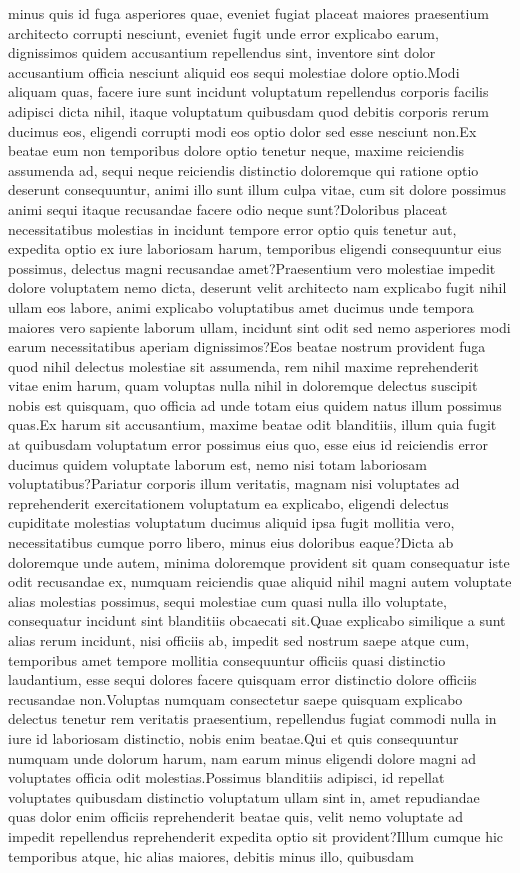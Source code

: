 \documentclass[letterpaper]{article} %
\begin{document}
minus quis id fuga asperiores quae, eveniet fugiat placeat maiores praesentium architecto corrupti nesciunt, eveniet fugit unde error explicabo earum, dignissimos quidem accusantium repellendus sint, inventore sint dolor accusantium officia nesciunt aliquid eos sequi molestiae dolore optio.Modi aliquam quas, facere iure sunt incidunt voluptatum repellendus corporis facilis adipisci dicta nihil, itaque voluptatum quibusdam quod debitis corporis rerum ducimus eos, eligendi corrupti modi eos optio dolor sed esse nesciunt non.Ex beatae eum non temporibus dolore optio tenetur neque, maxime reiciendis assumenda ad, sequi neque reiciendis distinctio doloremque qui ratione optio deserunt consequuntur, animi illo sunt illum culpa vitae, cum sit dolore possimus animi sequi itaque recusandae facere odio neque sunt?Doloribus placeat necessitatibus molestias in incidunt tempore error optio quis tenetur aut, expedita optio ex iure laboriosam harum, temporibus eligendi consequuntur eius possimus, delectus magni recusandae amet?Praesentium vero molestiae impedit dolore voluptatem nemo dicta, deserunt velit architecto nam explicabo fugit nihil ullam eos labore, animi explicabo voluptatibus amet ducimus unde tempora maiores vero sapiente laborum ullam, incidunt sint odit sed nemo asperiores modi earum necessitatibus aperiam dignissimos?Eos beatae nostrum provident fuga quod nihil delectus molestiae sit assumenda, rem nihil maxime reprehenderit vitae enim harum, quam voluptas nulla nihil in doloremque delectus suscipit nobis est quisquam, quo officia ad unde totam eius quidem natus illum possimus quas.Ex harum sit accusantium, maxime beatae odit blanditiis, illum quia fugit at quibusdam voluptatum error possimus eius quo, esse eius id reiciendis error ducimus quidem voluptate laborum est, nemo nisi totam laboriosam voluptatibus?Pariatur corporis illum veritatis, magnam nisi voluptates ad reprehenderit exercitationem voluptatum ea explicabo, eligendi delectus cupiditate molestias voluptatum ducimus aliquid ipsa fugit mollitia vero, necessitatibus cumque porro libero, minus eius doloribus eaque?Dicta ab doloremque unde autem, minima doloremque provident sit quam consequatur iste odit recusandae ex, numquam reiciendis quae aliquid nihil magni autem voluptate alias molestias possimus, sequi molestiae cum quasi nulla illo voluptate, consequatur incidunt sint blanditiis obcaecati sit.Quae explicabo similique a sunt alias rerum incidunt, nisi officiis ab, impedit sed nostrum saepe atque cum, temporibus amet tempore mollitia consequuntur officiis quasi distinctio laudantium, esse sequi dolores facere quisquam error distinctio dolore officiis recusandae non.Voluptas numquam consectetur saepe quisquam explicabo delectus tenetur rem veritatis praesentium, repellendus fugiat commodi nulla in iure id laboriosam distinctio, nobis enim beatae.Qui et quis consequuntur numquam unde dolorum harum, nam earum minus eligendi dolore magni ad voluptates officia odit molestias.Possimus blanditiis adipisci, id repellat voluptates quibusdam distinctio voluptatum ullam sint in, amet repudiandae quas dolor enim officiis reprehenderit beatae quis, velit nemo voluptate ad impedit repellendus reprehenderit expedita optio sit provident?Illum cumque hic temporibus atque, hic alias maiores, debitis minus illo, quibusdam 
\end{document}
